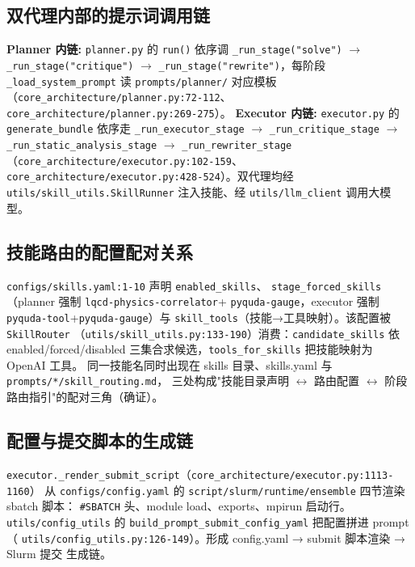 \documentclass[UTF8]{ctexart}
\begin{document}
\subsection{双代理内部的提示词调用链}

\begin{ideabox}
\textbf{Planner 内链:} \texttt{planner.py} 的 \texttt{run()} 依序调
\texttt{\_run\_stage("solve")} $\rightarrow$ \texttt{\_run\_stage("critique")}
$\rightarrow$ \texttt{\_run\_stage("rewrite")}，每阶段 \texttt{\_load\_system\_prompt} 读
\texttt{prompts/planner/} 对应模板（\texttt{\nolinkurl{core_architecture/planner.py:72-112}}、
\texttt{\nolinkurl{core_architecture/planner.py:269-275}}）。
\textbf{Executor 内链:} \texttt{executor.py} 的 \texttt{generate\_bundle} 依序走
\texttt{\_run\_executor\_stage} $\rightarrow$ \texttt{\_run\_critique\_stage}
$\rightarrow$ \texttt{\_run\_static\_analysis\_stage} $\rightarrow$
\texttt{\_run\_rewriter\_stage}（\texttt{\nolinkurl{core_architecture/executor.py:102-159}}、
\texttt{\nolinkurl{core_architecture/executor.py:428-524}}）。双代理均经
\texttt{utils/skill\_utils.SkillRunner} 注入技能、经 \texttt{utils/llm\_client} 调用大模型。
\end{ideabox}

\subsection{技能路由的配置配对关系}

\texttt{configs/skills.yaml:1-10} 声明 \texttt{enabled\_skills}、
\texttt{stage\_forced\_skills}（planner 强制 \texttt{lqcd-physics-correlator}+
\texttt{pyquda-gauge}，executor 强制 \texttt{pyquda-tool}+\texttt{pyquda-gauge}）与
\texttt{skill\_tools}（技能→工具映射）。该配置被 \texttt{SkillRouter}
（\texttt{\nolinkurl{utils/skill_utils.py:133-190}}）消费：\texttt{candidate\_skills} 依
enabled/forced/disabled 三集合求候选，\texttt{tools\_for\_skills} 把技能映射为 OpenAI 工具。
同一技能名同时出现在 skills 目录、skills.yaml 与 \texttt{prompts/*/skill\_routing.md}，
三处构成"技能目录声明 $\leftrightarrow$ 路由配置 $\leftrightarrow$ 阶段路由指引"的配对三角（\textcolor{relation}{确证}）。

\subsection{配置与提交脚本的生成链}

\texttt{executor.\_render\_submit\_script}（\texttt{\nolinkurl{core_architecture/executor.py:1113-1160}}）
从 \texttt{configs/config.yaml} 的 \texttt{script/slurm/runtime/ensemble} 四节渲染 sbatch 脚本：
\texttt{\#SBATCH} 头、module load、exports、mpirun 启动行。\texttt{utils/config\_utils}
的 \texttt{build\_prompt\_submit\_config\_yaml} 把配置拼进 prompt（
\texttt{\nolinkurl{utils/config_utils.py:126-149}}）。形成
\textcolor{relation}{config.yaml → submit 脚本渲染 → Slurm 提交} 生成链。
\end{document}
